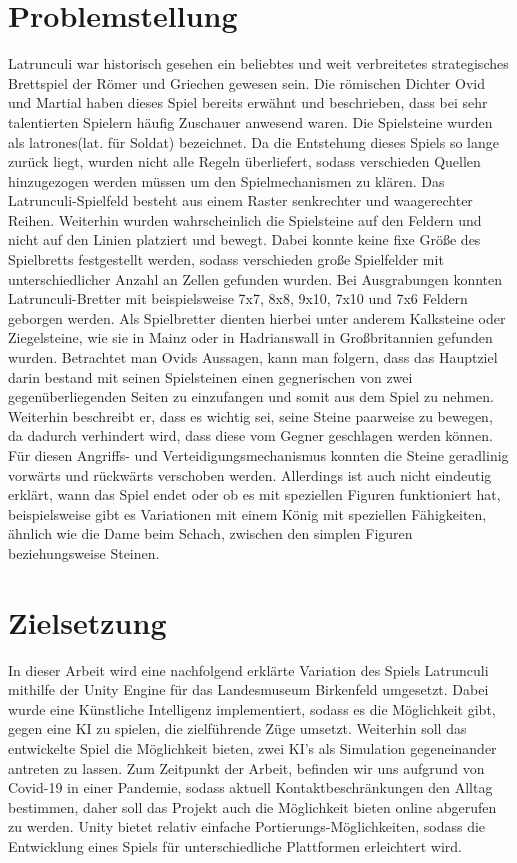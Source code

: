 \section{Problemstellung}
\label{ch:Einleitung:sec:Problemstellung}
Latrunculi war historisch gesehen ein beliebtes und weit verbreitetes strategisches Brettspiel der Römer und Griechen gewesen sein. Die römischen Dichter Ovid und Martial haben dieses Spiel bereits erwähnt und beschrieben, dass bei sehr talentierten Spielern häufig Zuschauer anwesend waren. Die Spielsteine wurden als latrones(lat. für Soldat) bezeichnet. Da die Entstehung dieses Spiels so lange zurück liegt, wurden nicht alle Regeln überliefert, sodass verschieden Quellen hinzugezogen werden müssen um den Spielmechanismen zu klären. Das Latrunculi-Spielfeld besteht aus einem Raster senkrechter und waagerechter Reihen. Weiterhin wurden wahrscheinlich die Spielsteine auf den Feldern und nicht auf den Linien platziert und bewegt. Dabei konnte keine fixe Größe des Spielbretts festgestellt werden, sodass verschieden große Spielfelder mit unterschiedlicher Anzahl an Zellen gefunden wurden. Bei Ausgrabungen konnten Latrunculi-Bretter mit beispielsweise 7x7, 8x8, 9x10, 7x10 und 7x6 Feldern geborgen werden. Als Spielbretter dienten hierbei unter anderem Kalksteine oder Ziegelsteine, wie sie in Mainz oder in Hadrianswall in Großbritannien gefunden wurden. Betrachtet man Ovids Aussagen, kann man folgern, dass das Hauptziel darin bestand mit seinen Spielsteinen einen gegnerischen von zwei gegenüberliegenden Seiten zu einzufangen und somit aus dem Spiel zu nehmen. Weiterhin beschreibt er, dass es wichtig sei, seine Steine paarweise zu bewegen, da dadurch verhindert wird, dass diese vom Gegner geschlagen werden können. Für diesen Angriffs- und Verteidigungsmechanismus konnten die Steine geradlinig vorwärts und rückwärts verschoben werden. Allerdings ist auch nicht eindeutig erklärt, wann das Spiel endet oder ob es mit speziellen Figuren funktioniert hat, beispielsweise gibt es Variationen mit einem König mit speziellen Fähigkeiten, ähnlich wie die Dame beim Schach, zwischen den simplen Figuren beziehungsweise Steinen.

\section{Zielsetzung}
\label{ch:Einleitung:sec:Zielsetzung}
In dieser Arbeit wird eine nachfolgend erklärte Variation des Spiels Latrunculi mithilfe der Unity Engine für das Landesmuseum Birkenfeld umgesetzt. Dabei wurde eine Künstliche Intelligenz implementiert, sodass es die Möglichkeit gibt, gegen eine KI zu spielen, die zielführende Züge umsetzt. Weiterhin soll das entwickelte Spiel die Möglichkeit bieten, zwei KI's als Simulation gegeneinander antreten zu lassen. Zum Zeitpunkt der Arbeit, befinden wir uns aufgrund von Covid-19 in einer Pandemie, sodass aktuell Kontaktbeschränkungen den Alltag bestimmen, daher soll das Projekt auch die Möglichkeit bieten online abgerufen zu werden. Unity bietet relativ einfache Portierungs-Möglichkeiten, sodass die Entwicklung eines Spiels für unterschiedliche Plattformen erleichtert wird.


